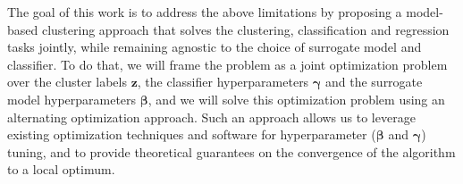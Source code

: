 \smallskip
The goal of this work is to address the above limitations by proposing a model-based clustering approach that solves the clustering, classification and regression tasks jointly, while remaining agnostic to the choice of surrogate model and classifier. To do that, we will frame the problem as a joint optimization problem over the cluster labels $\mathbf{z}$, the classifier hyperparameters $\boldsymbol{\gamma}$ and the surrogate model hyperparameters $\boldsymbol{\beta}$, and we will solve this optimization problem using an alternating optimization approach. Such an approach allows us to leverage existing optimization techniques and software for hyperparameter ($\boldsymbol{\beta}$ and $\boldsymbol{\gamma}$) tuning, and to provide theoretical guarantees on the convergence of the algorithm to a local optimum.
